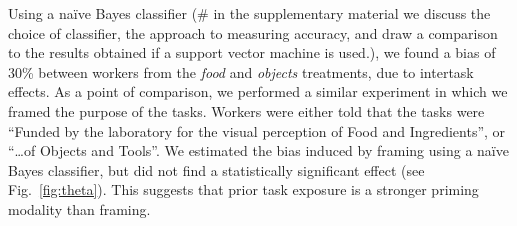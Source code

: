 \documentclass[12pt]{article}
\begin{document}
%
%
%
%
%
%
%
%

Using a na\"ive Bayes classifier (\# in the 
supplementary material we discuss the choice of classifier, the
approach to measuring accuracy, and draw a comparison to the results obtained 
if a support vector machine is used.), we found a bias of 30\% between 
workers from the \textit{food} and \textit{objects} treatments, due to 
intertask effects.
As a point of comparison, we performed a similar experiment in which we 
framed the purpose of the tasks.  Workers were either told that the tasks 
were ``Funded by the laboratory for the visual perception of Food and 
Ingredients'', or ``\ldots of Objects and Tools''.  We estimated the bias 
induced by framing using a na\"ive Bayes classifier, but did not find a 
statistically significant effect (see Fig.~\ref{fig:theta}).  This suggests
that prior task exposure is a stronger priming modality than framing.
\end{document}
